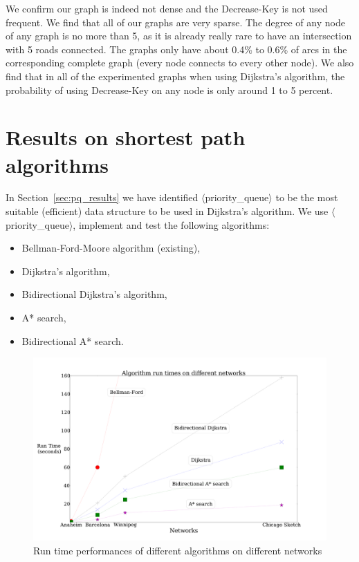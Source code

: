 We confirm our graph is indeed not dense and the Decrease-Key is not used frequent.
We find that all of our graphs are very sparse.
The degree of any node of any graph is no more than 5,
as it is already really rare to have an intersection with 5 roads connected.
The graphs only have about 0.4\% to 0.6\% of arcs in the corresponding complete graph (every node connects to every other node).
We also find that in all of the experimented graphs when using Dijkstra's algorithm,
the probability of using Decrease-Key on any node is only around 1 to 5 percent.

\section{Results on shortest path algorithms} \label{sec:allresults}
In Section~\ref{sec:pq_results} we have identified  $\langle$priority\_queue$\rangle$ to be the most suitable (efficient) data structure to be used in Dijkstra's algorithm.
We use $\langle$priority\_queue$\rangle$, implement and test the following algorithms:
\begin{itemize}
        \item Bellman-Ford-Moore algorithm (existing),
        \item Dijkstra's algorithm,
        \item Bidirectional Dijkstra's algorithm,
        \item A* search,
        \item Bidirectional A* search.
\end{itemize}
\begin{figure}[t]
    \centering
    \includegraphics[trim=0 2em 0 10em, clip, width=\textwidth]{img/runtime}
    \caption{Run time performances of different algorithms on different networks}
    \label{fig:allresults}
\end{figure}

